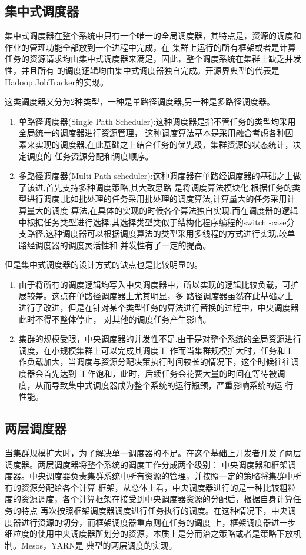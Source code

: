 \subsection{集中式调度器}
集中式调度器在整个系统中只有一个唯一的全局调度器，其特点是，资源的调度和作业的管理功能全部放到一个进程中完成，在
集群上运行的所有框架或者是计算任务的资源请求均由集中式调度器来满足，因此，整个调度系统在集群上缺乏并发性，并且所有
的调度逻辑均由集中式调度器独自完成。开源界典型的代表是Hadoop JobTracker的实现。

这类调度器又分为2种类型，一种是单路径调度器,另一种是多路径调度器。
\begin{enumerate}
\item 单路径调度器(Single Path Scheduler):这种调度器是指不管任务的类型均采用全局统一的调度器进行资源管理，
这种调度算法基本是采用融合考虑各种因素来实现的调度器,在此基础之上结合任务的优先级，集群资源的状态统计，决定调度的
任务资源分配和调度顺序。
\item 多路径调度器(Multi Path scheduler):这种调度器在单路经调度器的基础之上做了该进,首先支持多种调度策略,其大致思路
是将调度算法模块化,根据任务的类型进行调度,比如批处理的任务采用批处理的调度算法,计算量大的任务采用计算量大的调度
算法,在具体的实现的时候各个算法独自实现,而在调度器的逻辑中根据任务类型进行选择,其选择类型类似于结构化程序编程的switch
-case分支路径,这种调度器可以根据调度算法的类型采用多线程的方式进行实现,较单路经调度器的调度灵活性和
并发性有了一定的提高。
\end{enumerate}

但是集中式调度器的设计方式的缺点也是比较明显的。
\begin{enumerate}
\item 由于将所有的调度逻辑均写入中央调度器中，所以实现的逻辑比较负载，可扩展较差。这点在单路径调度器上尤其明显，多
路径调度器虽然在此基础之上进行了改进，但是在针对某个类型任务的算法进行替换的过程中，中央调度器此时不得不整体停止，
对其他的调度任务产生影响。
\item 集群的规模受限，中央调度器的并发性不足.由于是对整个系统的全局资源进行调度，在小规模集群上可以完成其调度工
作而当集群规模扩大时，任务和工作负载加大，当调度与资源分配决策执行时间较长的情况下，这个时候往往调度器会首先达到
工作饱和，此时，后续任务会花费大量的时间在等待被调度，从而导致集中式调度器成为整个系统的运行瓶颈，严重影响系统的运
行性能。
\end{enumerate}

\subsection{两层调度器}
当集群规模扩大时，为了解决单一调度器的不足。在这个基础上开发者开发了两层调度器。两层调度器将整个系统的调度工作分成两个级别：
中央调度器和框架调度器。中央调度器负责集群系统中所有资源的管理，并按照一定的策略将集群中所有的资源分配给各个计算
框架，从总体上看，中央调度器进行的是一种比较粗粒度的资源调度，各个计算框架在接受到中央调度器资源的分配后，根据自身计算任务的特点
再次按照框架调度器调度进行任务执行的调度。在这种情况下，中央调度器进行资源的切分，而框架调度器重点则在任务的调度
上，框架调度器进一步细粒度的使用中央调度器所划分的资源，本质上是分而治之策略或者是策略下放机制。Mesos，YARN是
典型的两层调度的实现。

